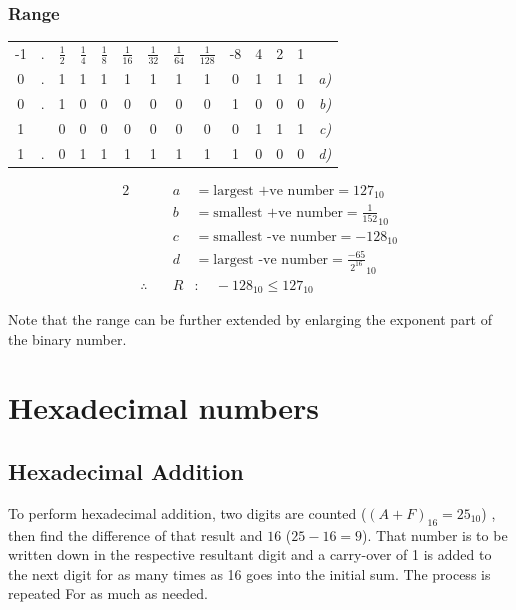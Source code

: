 \documentclass[12pt, a4paper]{report}
\begin{document}
	\subsubsection{Range}
	\begin{center}
		\begin{tabular}{ccccccccc|ccccr}
			-1 & . & $\frac{1}{2}$ & $\frac{1}{4}$ & $\frac{1}{8}$ & $\frac{1}{16}$ & $\frac{1}{32}$ & $\frac{1}{64}$ & $\frac{1}{128}$ & -8 & 4 & 2 & 1 & \multicolumn{1}{l}{} \\ \cline{1-13}
			0  & . & 1             & 1             & 1             & 1              & 1              & 1              & 1               & 0  & 1 & 1 & 1 & \textit{a)}          \\
			0  & . & 1             & 0             & 0             & 0              & 0              & 0              & 0               & 1  & 0 & 0 & 0 & \textit{b)}          \\
			1  &   & 0             & 0             & 0             & 0              & 0              & 0              & 0               & 0  & 1 & 1 & 1 & \textit{c)}          \\
			1  & . & 0             & 1             & 1             & 1              & 1              & 1              & 1               & 1  & 0 & 0 & 0 & \textit{d)}          
		\end{tabular}
		\begin{alignat*}{2}
			&                 & a & = \text{largest +ve number} = 127_{10}                \\
			&                 & b & = \text{smallest +ve number} = \frac{1}{152}_{10}     \\
			&                 & c & = \text{smallest -ve number} = -128_{10}              \\
			&                 & d & = \text{largest -ve number} = \frac{-65}{2^{16}}_{10} \\
			& \therefore\quad & R & :\quad -128_{10} \leq 127_{10}                        
		\end{alignat*}
	\end{center}
	Note that the range can be further extended by enlarging the exponent part of the binary number.
	\newpage
	\section{Hexadecimal numbers}
	\subsection{Hexadecimal Addition}
	\quad To perform hexadecimal addition, two digits are counted ($(A+F)_{16}= 25_{10}$) , then find the difference of that result and $ 16 $ ($ 25-16 = 9 $). That number is to be written down in the respective resultant digit and a carry-over of 1 is added to the next digit for as many times as 16 goes into the initial sum. The process is repeated For as much as needed.\\
	
\end{document}
